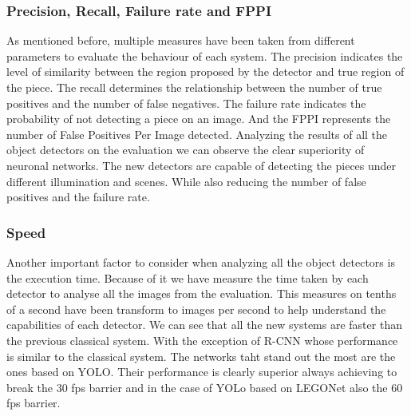 {\subsubsection*{Precision, Recall, Failure rate and FPPI}
As mentioned before, multiple measures have been taken from different parameters to evaluate the behaviour of each system. The precision indicates the level of similarity between the region proposed by the detector and true region of the piece. The recall determines the relationship between the number of true positives and the number of false negatives. The failure rate indicates the probability of not detecting a piece on an image. And the FPPI represents the number of False Positives Per Image detected. Analyzing the results of all the object detectors on the evaluation we can observe the clear superiority of neuronal networks. The new detectors are capable of detecting the pieces under different illumination and scenes. While also reducing the number of false positives and the failure rate. 


\subsubsection*{Speed}
Another important factor to consider when analyzing all the object detectors is the execution time. Because of it we have measure the time taken by each detector to analyse all the images from the evaluation. This measures on tenths of a second have been transform to images per second to help understand the capabilities of each detector. We can see that all the new systems are faster than the previous classical system. With the exception of R-CNN whose performance is similar to the classical system. The networks taht stand out the most are the ones based on YOLO. Their performance is clearly superior always achieving to break the 30 fps barrier and in the case of YOLo based on LEGONet also the 60 fps barrier.

}
